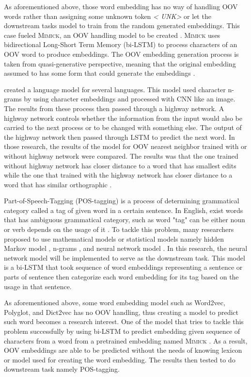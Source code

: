As aforementioned above, those word embedding has no way of handling
OOV words rather than assigning some unknown token \textit{\textless
UNK\textgreater} or let the downstream tasks model to train from the
random generated embeddings. This case fueled \textsc{Mimick}, an OOV
handling model to be created \citep{mimicking2017Pinter}.
\textsc{Mimick} uses bidirectional Long-Short Term Memory (bi-LSTM) to
process characters of an OOV word to produce embeddings. The OOV
embedding generation process is taken from quasi-generative
perspective, meaning that the original embedding assumed to has some
form that could generate the embeddings \citep{mimicking2017Pinter}. 

\cite{character2015kim} created a language model for several
languages. This model used character n-grams by using character
embeddings and processed with CNN like an image. The results from
these process then passed through a highway network. A highway network
controls whether the information from the input would also be carried
to the next process or to be changed with something else. The output
of the highway network then passed through LSTM to predict the next
word. In those research, the results of the model for OOV nearest
neighbor trained with or without highway network were compared. The
results was that the one trained without highway network has closer
distance to a word that has smallest edits while the one that trained
with the highway network has closer distance to a word that has
similar orthographic \citep{character2015kim}.

Part-of-Speech-Tagging (POS-tagging) is a process of determining
grammatical category called a tag of given word in a certain sentence.
In English, exist words that has ambiguous grammatical category, such
as word "tag" can be either noun or verb depends on the usage of it
\citep{apractical1992cutting}. To tackle this problem, many
researchers proposed to use mathematical models or statistical models
namely hidden Markov model \citep{apractical1992cutting}, n-grams
\citep{tnt2000Brants}, and neural network model
\citep{finding2015ling}. In this research, the neural network model
will be implemented to serve as the downstream task. This model is a
bi-LSTM that took sequence of word embeddings representing a sentence
or parts of sentence then categorize each word embedding for its tag
based on the usage in that sentence.

As aforementioned above, some word embedding model such as Word2vec,
Polyglot, and Dict2vec has no OOV handling, thus creating a model to
predict such word becomes a research interest. One of the model that
tries to tackle this problem successfully by using bi-LSTM to predict
embedding given sequence of characters from a word from a pretrained
embedding named \textsc{Mimick} \citep{mimicking2017Pinter}. As a
result, OOV embeddings are able to be predicted without the needs of
knowing lexicon or model used for creating the word embedding. The
results then tested to do downstream task namely POS-tagging.

